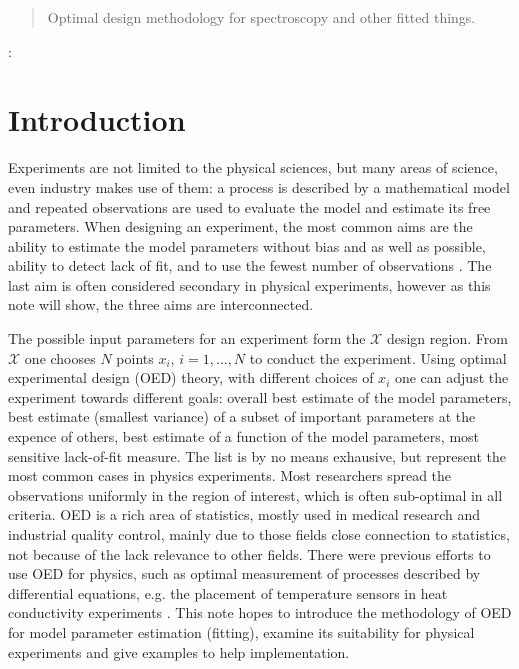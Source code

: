 \documentclass[12pt]{iopart}
\begin{document}
\address{Institute of Atomic and Molecular Sciences, Academia Sinica, Taiwan}
\begin{abstract}
Optimal design methodology for spectroscopy and other fitted things.
\end{abstract}

:

\pacs{}

\section{Introduction}

Experiments are not limited to the physical sciences, but many areas of science, even industry makes use of them: a process is described by a mathematical model and repeated observations are used to evaluate the model and estimate its free parameters. When designing an experiment, the most common aims are the ability to estimate the model parameters without bias and as well as possible, ability to detect lack of fit, and to use the fewest number of observations \cite{Box1975,Box1987}. The last aim is often considered secondary in physical experiments, however as this note will show, the three aims are interconnected.

The possible input parameters for an experiment form the $\mathcal{X}$ design region. From $\mathcal{X}$ one chooses $N$ points $x_i$, $i = 1, \ldots, N$ to conduct the experiment. Using optimal experimental design (OED) theory, with different choices of $x_i$ one can adjust the experiment towards different goals: overall best estimate of the model parameters, best estimate (smallest variance) of a subset of important parameters at the expence of others, best estimate of a function of the model parameters, most sensitive lack-of-fit measure. The list is by no means exhausive, but represent the most common cases in physics experiments. Most researchers spread the observations uniformly in the region of interest, which is often sub-optimal in all criteria. OED is a rich area of statistics, mostly used in medical research and industrial quality control, mainly due to those fields close connection to statistics, not because of the lack relevance to other fields. There were previous efforts to use OED for physics, such as optimal measurement of processes described by differential equations, e.g. the placement of temperature sensors in heat conductivity experiments \cite{Emery1998}. This note hopes to introduce the methodology of OED for model parameter estimation (fitting), examine its suitability for physical experiments and give examples to help implementation.
\end{document}
